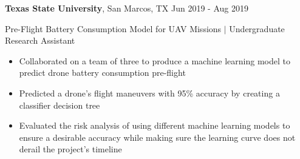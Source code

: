 \documentclass[10pt]{article}
\begin{document}
\textbf{Texas State University}, San Marcos, TX \hfill Jun 2019 - Aug 2019\par
Pre-Flight Battery Consumption Model for UAV Missions $\vert$ Undergraduate Research Assistant
\begin{itemize}
	\item Collaborated on a team of three to produce a machine learning model to predict drone battery consumption pre-flight
	\item Predicted a drone's flight maneuvers with 95\% accuracy by creating a classifier decision tree
	\item Evaluated the risk analysis of using different machine learning models to ensure a desirable accuracy while making sure the learning curve does not derail the project's timeline
\end{itemize}

%
\end{document}
